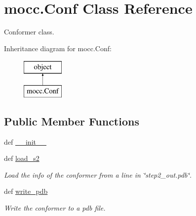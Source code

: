 \hypertarget{classmocc_1_1_conf}{\section{mocc.\-Conf Class Reference}
\label{classmocc_1_1_conf}
}


Conformer class.  


Inheritance diagram for mocc.\-Conf\-:\begin{figure}[H]
\begin{center}
\leavevmode
\includegraphics[height=2.000000cm]{classmocc_1_1_conf}
\end{center}
\end{figure}
\subsection*{Public Member Functions}
\begin{DoxyCompactItemize}
\item 
def \hyperlink{classmocc_1_1_conf_aa500603293a8484e5a5be6b8c464aea2}{\-\_\-\-\_\-init\-\_\-\-\_\-}
\item 
def \hyperlink{classmocc_1_1_conf_acd95b13da7989dcab1ae34694c4a1869}{load\-\_\-s2}
\begin{DoxyCompactList}\small\item\em Load the info of the conformer from a line in \char`\"{}step2\-\_\-out.\-pdb\char`\"{}. \end{DoxyCompactList}\item 
def \hyperlink{classmocc_1_1_conf_a70483b8650a6ea020699a2aeeeb8bc8b}{write\-\_\-pdb}
\begin{DoxyCompactList}\small\item\em Write the conformer to a pdb file. \end{DoxyCompactList}\end{DoxyCompactItemize}
